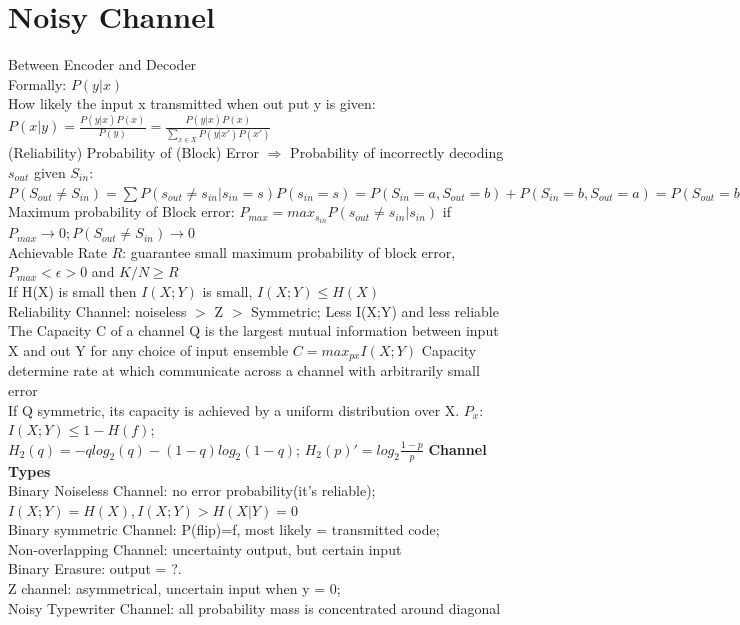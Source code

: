 \documentclass[12pt,a4paper]{extarticle}
\begin{document}
\section{Noisy Channel}
Between Encoder and Decoder\\
Formally: $P(y|x)$\\
How likely the input x transmitted when out put y is given:$P(x|y)=\frac{P(y|x)P(x)}{P(y)}=\frac{P(y|x)P(x)}{\sum_{x\in X} P(y|x')P(x')}$\\
(Reliability) Probability of (Block) Error $\Rightarrow$ Probability of incorrectly decoding $s_{out}$ given $S_{in}$: $P(S_{out}\neq S_{in})=\sum P(s_{out}\neq s_{in}|s_{in}=s)P(s_{in}=s)=P(S_{in}=a,S_{out} = b)+P(S_{in} = b,S_{out}=a)=P(S_{out}=b|S_{in} = a)P(S_{in}=a)+P(S_{out} = a|S_{in}=b)P(S_{in}=b)$\\
 Maximum probability of Block error: $P_{max} = max_{s_{in}}P(s_{out}\neq s_{in}|s_{in})$ if $P_{max} \rightarrow 0; P (S_{out}\neq S_{in}) \rightarrow 0$\\
 Achievable Rate $R$: guarantee small maximum probability of block error, $P_{max} < \epsilon > 0$ and $K/N \geq R$ \\
If H(X) is small then $I(X;Y)$ is small, $I(X;Y)\leq H(X)$\\
Reliability Channel: noiseless $>$ Z $>$ Symmetric; Less I(X;Y) and less reliable\\
The Capacity C of a channel Q is the largest mutual information between input X and out Y for any choice of input ensemble $C = max_{px}I(X;Y)$ Capacity determine rate at which communicate across a channel with arbitrarily small error\\
If Q symmetric, its capacity is achieved by a uniform distribution over X. $P_x$:$I(X;Y)\leq 1-H(f)$;\\
$H_2(q) = -qlog_2(q)-(1-q)log_2(1-q)$; $H_2(p)'=log_2\frac{1-p}{p}$
\newline
\textbf{Channel Types}\\
Binary Noiseless Channel: no error probability(it's reliable); $I(X;Y)=H(X), I(X;Y)>H(X|Y)=0$\\
Binary symmetric Channel: P(flip)=f, most likely = transmitted code; \\
Non-overlapping Channel: uncertainty output, but certain input\\
Binary Erasure: output =  ?.\\
Z channel: asymmetrical, uncertain input when y = 0;\\
Noisy Typewriter Channel: all probability mass is concentrated around diagonal
\end{document}
